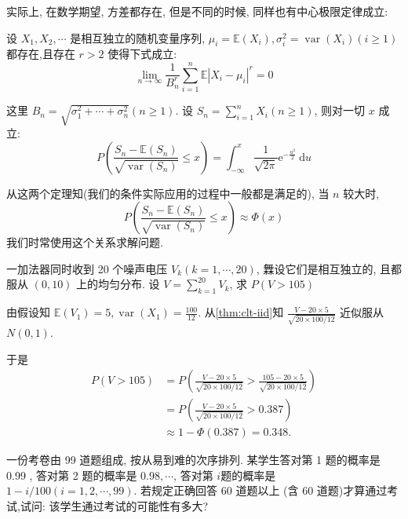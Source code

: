     实际上, 在数学期望, 方差都存在, 但是不同的时候, 同样也有中心极限定律成立: 

    \begin{theorem}
        \label{thm:clt-gen}
        设 $X_1, X_2, \cdots$ 是相互独立的随机变量序列, $\mu_i=\mathbb{E}\left(X_i\right), \sigma_i^2=\operatorname{var}\left(X_i\right)(i \geq 1)$ 都存在,且存在 $r>2$ 使得下式成立:
$$
\lim _{n \rightarrow \infty} \frac{1}{B_n^r} \sum_{i=1}^n \mathbb{E}\left|X_i-\mu_i\right|^r=0
$$

这里 $B_n=\sqrt{\sigma_1^2+\cdots+\sigma_n^2}(n \geq 1)$. 设 $S_n=\sum_{i=1}^n X_i(n \geq 1)$, 则对一切 $x$ 成立:
$$
P\left(\frac{S_n-\mathbb{E}\left(S_n\right)}{\sqrt{\operatorname{var}\left(S_n\right)}} \leq x\right)=\int_{-\infty}^x \frac{1}{\sqrt{2 \pi}} \mathrm{e}^{-\frac{u^2}{2}} \mathrm{~d} u
$$
    \end{theorem}

    从这两个定理知(我们的条件实际应用的过程中一般都是满足的), 当 $n$ 较大时,
$$
P\left(\frac{S_n-\mathbb{E}\left(S_n\right)}{\sqrt{\operatorname{var}\left(S_n\right)}} \leq x\right) \approx \Phi(x)
$$
     我们时常使用这个关系求解问题. 

     \begin{example}
        一加法器同时收到 20 个噪声电压 $V_k(k=1, \cdots, 20)$, 橆设它们是相互独立的, 且都服从 $(0,10)$ 上的均匀分布. 设 $V=\sum_{k=1}^{20} V_k$, 求 $P(V>105)$
     \end{example}

     \begin{solution}
        由假设知 $\mathbb{E}\left(V_1\right)=5, \operatorname{var}\left(X_1\right)=\frac{100}{12}$. 从\cref{thm:clt-iid}知 $\frac{V-20 \times 5}{\sqrt{20 \times 100 / 12}}$ 近似服从 $N(0,1)$.

        于是
        $$
        \begin{aligned}
        P(V>105) & =P\left(\frac{V-20 \times 5}{\sqrt{20 \times 100 / 12}}>\frac{105-20 \times 5}{\sqrt{20 \times 100 / 12}}\right) \\
        & =P\left(\frac{V-20 \times 5}{\sqrt{20 \times 100 / 12}}>0.387\right) \\
        & \approx 1-\Phi(0.387)=0.348 .
        \end{aligned}
        $$ 
     \end{solution}


     \begin{example}
        一份考卷由 99 道题组成, 按从易到难的次序排列. 某学生答对第 1 题的概率是 0.99 , 答对第 2 题的概率是 $0.98, \cdots$, 答对第 $i$题的概率是 $1-i / 100(i=1,2, \cdots, 99)$. 若规定正确回答 60 道题以上 (含 60 道题)才算通过考试,试问: 该学生通过考试的可能性有多大?
     \end{example}

